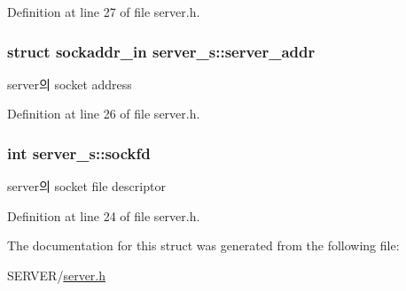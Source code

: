 Definition at line 27 of file server.\-h.

\hypertarget{structserver__s_aa49ed3594b99b1da4de179995dfa553d}{
\subsubsection[{server\-\_\-addr}]{\setlength{\rightskip}{0pt plus 5cm}struct sockaddr\-\_\-in server\-\_\-s\-::server\-\_\-addr}}\label{structserver__s_aa49ed3594b99b1da4de179995dfa553d}


server의 socket address 



Definition at line 26 of file server.\-h.

\hypertarget{structserver__s_a7109ed4db0376f7de840d82c4379099d}{
\subsubsection[{sockfd}]{\setlength{\rightskip}{0pt plus 5cm}int server\-\_\-s\-::sockfd}}\label{structserver__s_a7109ed4db0376f7de840d82c4379099d}


server의 socket file descriptor 



Definition at line 24 of file server.\-h.



The documentation for this struct was generated from the following file\-:\begin{DoxyCompactItemize}
\item 
S\-E\-R\-V\-E\-R/\hyperlink{server_8h}{server.\-h}\end{DoxyCompactItemize}
